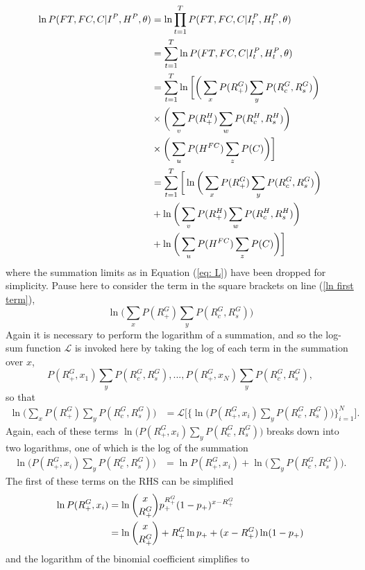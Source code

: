 \begin{align} \notag
\ln P(FT, FC, C | I^P, H^P, \theta) &= \ln \prod_{t=1}^{T} P(FT, FC, C | I_t^P, H_t^P, \theta) \\ \notag
&= \sum_{t=1}^{T}  \ln P(FT, FC, C | I_t^P, H_t^P, \theta) \\ \notag
&= \sum_{t=1}^{T} \ln \bigg[ \bigg( \sum_x P(R_+^G) \sum_y P(R_c^G, R_s^G) \bigg) \\ \notag
&\times \bigg( \sum_v P(R_+^H) \sum_w P(R_c^H, R_s^H) \bigg) \\ \notag
&\times \bigg( \sum_u P(H^{FC}) \sum_z P(C) \bigg) \bigg] \\ \label{ln first term}
&= \sum_{t=1}^{T} \bigg[ \ln \bigg( \sum_x P(R_+^G) \sum_y P(R_c^G, R_s^G) \bigg) \\ \label{ln second term}
&+ \ln \bigg( \sum_v P(R_+^H) \sum_w P(R_c^H, R_s^H) \bigg) \\  \label{ln third term}
&+ \ln \bigg( \sum_u P(H^{FC}) \sum_z P(C) \bigg) \bigg]
\end{align}
where the summation limits as in Equation (\ref{eq: L}) have been dropped for simplicity.
Pause here to consider the term in the square brackets on line (\ref{ln first term}), \[\ln \bigg(\sum_x P(R_+^G) \sum_y P(R_c^G, R_s^G)\bigg)\]
Again it is necessary to perform the logarithm of a summation, and so the log-sum function $\mathcal{L}$ is invoked here by taking the log of each term in the summation over $x$, \[P(R_+^G, x_1) \sum_y P(R_c^G, R_s^G), ..., P(R_+^G, x_N) \sum_y P(R_c^G, R_s^G),\]
so that
\begin{align}
	\ln \bigg( \sum_x P(R_+^G) \sum_y P(R_c^G, R_s^G) \bigg)&= \mathcal{L}\bigg [\{\ln \bigg( P(R_+^G, x_i) \sum_y P(R_c^G, R_s^G)\bigg) \}_{i=1}^{N} \bigg].
\end{align}
Again, each of these terms $\ln \big( P(R_+^G, x_i) \sum_y P(R_c^G, R_s^G)\big)$ breaks down into two logarithms, one of which is the log of the summation
\begin{align}
	\ln \big( P(R_+^G, x_i) \sum_y P(R_c^G, R_s^G) \big) &= \ln P(R_+^G, x_i) + \ln \big(\sum_y P(R_c^G, R_s^G)\big).
\end{align}
The first of these terms on the RHS can be simplified
\begin{align} \notag
	\ln P(R_+^G, x_i) &= \ln \binom{x}{R_{+}^G} p_+^{R_{+}^G}(1-p_+)^{x-R_{+}^G} \\
	&= \ln \binom{x}{R_{+}^G} + R_{+}^G\ln p_+ + (x-R_{+}^G) \ln (1-p_+)
\end{align}
and the logarithm of the binomial coefficient simplifies to
